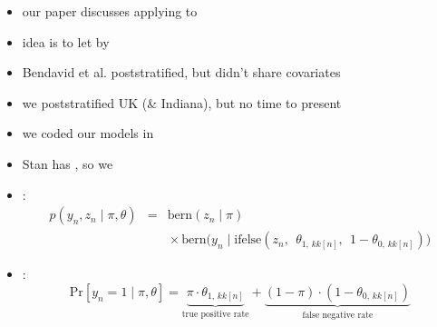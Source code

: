\documentclass[9pt]{report}
\begin{document}
\begin{itemize}
\item our paper discusses applying  to
\item idea is to let  by
\item Bendavid et al. poststratified, but didn't share covariates
\item we poststratified UK (\& Indiana), but no time to present
\end{itemize}

\begin{itemize}
\item we coded our models in 
\item Stan has , so we
\item {}:
  {\small
  \begin{eqnarray*}
    p(y_n, z_n \mid \pi, \theta)
    & = & \textrm{bern}(z_n \mid \pi)
          \\
    & & {} \times \textrm{bern}\big(y_n \mid \textrm{ifelse}(z_n,
        \ \  \theta_{1,
      \, kk[n]},  \ \ 1 - \theta_{0, \, kk[n]})\big)
  \end{eqnarray*}}
  \item {}:
  $$\textrm{Pr}\left[y_n = 1 \mid \pi, \theta\right]
    = \underbrace{\pi \cdot \theta_{1, \, kk[n]}}_{\textrm{true
        positive rate}}
    + \underbrace{(1 - \pi) \cdot (1 - \theta_{0, \,
        kk[n]})}_{\textrm{false negative rate}}$$
\end{itemize}
\end{document}
